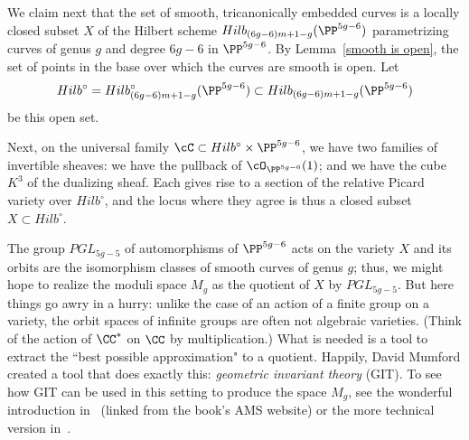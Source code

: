 We claim next that the set of smooth, tricanonically embedded curves is a locally closed subset $X$ of the Hilbert scheme $Hilb_{(6g-6)m+1-g}(\PP^{5g-6})$ parametrizing curves of genus $g$ and degree $6g-6$ in $\PP^{5g-6}$. By Lemma~\ref{smooth is open}, the set of points in the base over which the curves are smooth is open.  Let 
$$
Hilb^\circ = Hilb^\circ_{(6g-6)m+1-g}(\PP^{5g-6})\subset Hilb_{(6g-6)m+1-g}(\PP^{5g-6})
$$
be this open set.

Next, on the universal family $\cC \subset Hilb^\circ \times \PP^{5g-6}$, we have two families of invertible sheaves: we have the pullback of $\cO_{\PP^{5g-6}}(1)$; and we have the cube $K^3$ of the dualizing sheaf. Each gives rise to a section of the relative Picard variety over $Hilb^\circ$, and the locus where they agree is thus a closed subset $X \subset Hilb^\circ$.

The group $PGL_{5g-5}$ of automorphisms of $\PP^{5g-6}$ acts on the variety $X$ and its orbits
are the isomorphism classes of smooth curves of genus $g$; thus, we might hope to realize the moduli space $M_g$ as the quotient of $X$ by $PGL_{5g-5}$. But here things go awry in a hurry: unlike the case of an action of a finite group on a variety,
the orbit spaces of infinite groups are often not algebraic varieties. (Think of the action of $\CC^*$ on $\CC$ by multiplication.) What is needed is a tool to extract the ``best possible approximation" to a quotient. Happily, David Mumford created a tool that does exactly this:  \emph{geometric invariant theory} (GIT).  To see how GIT can be used in this  setting to produce the space $M_g$, see the wonderful introduction in~\cite{Mumford-Suominen} (linked from the book's AMS website) or the more technical version in~\cite{MR0450272}.

%

